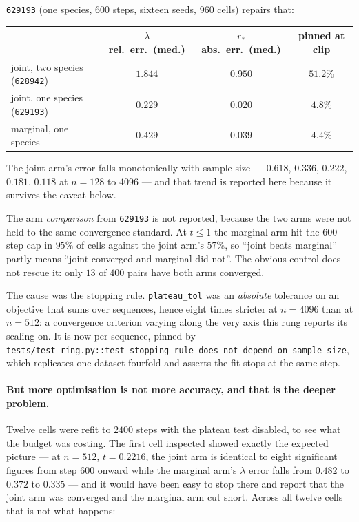 \texttt{629193} (one species, $600$ steps, sixteen seeds, $960$ cells) repairs that:

\begin{center}\small
\begin{tabular}{lccc}
\toprule
 & $\lambda$ rel.\ err.\ (med.) & $r_*$ abs.\ err.\ (med.) & pinned at clip \\
\midrule
joint, two species (\texttt{628942}) & $1.844$ & $0.950$ & $51.2\%$ \\
joint, one species (\texttt{629193}) & $0.229$ & $0.020$ & $4.8\%$ \\
marginal, one species                & $0.429$ & $0.039$ & $4.4\%$ \\
\bottomrule
\end{tabular}
\end{center}

\noindent The joint arm's error falls monotonically with sample size --- $0.618$, $0.336$, $0.222$,
$0.181$, $0.118$ at $n = 128$ to $4096$ --- and that trend is reported here because it survives the
caveat below.

\begin{pitfall}
The arm \emph{comparison} from \texttt{629193} is not reported, because the two arms were not held to
the same convergence standard. At $t\le1$ the marginal arm hit the $600$-step cap in $95\%$ of cells
against the joint arm's $57\%$, so ``joint beats marginal'' partly means ``joint converged and
marginal did not''. The obvious control does not rescue it: only $13$ of $400$ pairs have both arms
converged.

The cause was the stopping rule. \texttt{plateau\_tol} was an \emph{absolute} tolerance on an
objective that sums over sequences, hence eight times stricter at $n{=}4096$ than at $n{=}512$: a
convergence criterion varying along the very axis this rung reports its scaling on. It is now
per-sequence, pinned by
\texttt{tests/test\_ring.py::test\_stopping\_rule\_does\_not\_depend\_on\_sample\_size}, which
replicates one dataset fourfold and asserts the fit stops at the same step.
\end{pitfall}

\paragraph{But more optimisation is not more accuracy, and that is the deeper problem.}
\label{sec:rung4a-nonmonotone}
Twelve cells were refit to $2400$ steps with the plateau test disabled, to see what the budget was
costing. The first cell inspected showed exactly the expected picture --- at $n{=}512$,
$t{=}0.2216$, the joint arm is identical to eight significant figures from step $600$ onward while
the marginal arm's $\lambda$ error falls from $0.482$ to $0.372$ to $0.335$ --- and it would have
been easy to stop there and report that the joint arm was converged and the marginal arm cut short.
Across all twelve cells that is not what happens:

